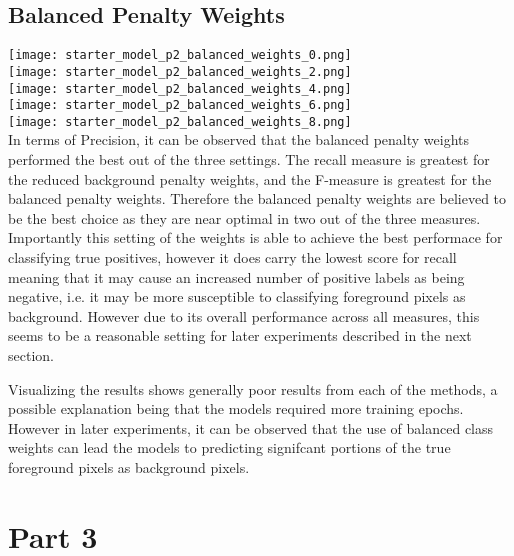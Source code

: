 \documentclass{article}
\begin{document}
	\subsection*{Balanced Penalty Weights}
		
		\texttt{[image: starter\_model\_p2\_balanced\_weights\_0.png]} \\
		\texttt{[image: starter\_model\_p2\_balanced\_weights\_2.png]} \\
		\texttt{[image: starter\_model\_p2\_balanced\_weights\_4.png]} \\
		\texttt{[image: starter\_model\_p2\_balanced\_weights\_6.png]} \\
		\texttt{[image: starter\_model\_p2\_balanced\_weights\_8.png]} \\

In terms of Precision, it can be observed that the balanced penalty weights performed the best out of the three settings. The recall measure is greatest for the reduced background penalty weights, and the F-measure is greatest for the balanced penalty weights. Therefore the balanced penalty weights are believed to be the best choice as they are near optimal in two out of the three measures. Importantly this setting of the weights is able to achieve the best performace for classifying true positives, however it does carry the lowest score for recall meaning that it may cause an increased number of positive labels as being negative, i.e. it may be more susceptible to classifying foreground pixels as background. However due to its overall performance across all measures, this seems to be a reasonable setting for later experiments described in the next section.

Visualizing the results shows generally poor results from each of the methods, a possible explanation being that the models required more training epochs. However in later experiments, it can be observed that the use of balanced class weights can lead the models to predicting signifcant portions of the true foreground pixels as background pixels.

\section*{Part 3}
\end{document}
